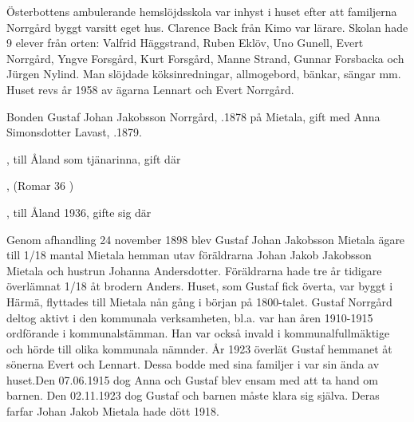 
Österbottens ambulerande hemslöjdsskola var inhyst i huset efter att familjerna Norrgård byggt varsitt eget hus. Clarence Back från Kimo var lärare. Skolan hade 9 elever från orten: Valfrid Häggstrand, Ruben Eklöv, Uno Gunell, Evert Norrgård, Yngve Forsgård, Kurt Forsgård, Manne Strand, Gunnar Forsbacka och Jürgen Nylind. Man slöjdade köksinredningar, allmogebord, bänkar, sängar mm. Huset revs år 1958 av ägarna Lennart och Evert Norrgård.


Bonden Gustaf Johan Jakobsson Norrgård, .1878 på Mietala, gift med Anna Simonsdotter Lavast, .1879.
\begin{jhchildren}
  \item {}, till Åland som tjänarinna, gift där
  \item {}
  \item {}
  \item {}
  \item {}, (Romar 36 )
  \item {}, till Åland 1936, gifte sig där
\end{jhchildren}
Genom afhandling 24 november 1898 blev Gustaf Johan Jakobsson Mietala ägare till 1/18 mantal Mietala hemman utav föräldrarna Johan Jakob Jakobsson Mietala och hustrun Johanna Andersdotter. Föräldrarna hade tre år tidigare överlämnat 1/18 åt brodern Anders.
Huset, som Gustaf fick överta, var byggt i Härmä, flyttades till Mietala nån gång i början på 1800-talet. Gustaf Norrgård deltog aktivt i den kommunala verksamheten, bl.a. var han åren 1910-1915 ordförande i kommunalstämman. Han var också invald i kommunalfullmäktige och hörde till olika kommunala nämnder. År 1923 överlät Gustaf hemmanet åt sönerna Evert och
Lennart. Dessa bodde med sina familjer i var sin ända av huset.Den 07.06.1915 dog Anna och Gustaf blev ensam med att ta hand om barnen. Den 02.11.1923 dog Gustaf och barnen måste klara sig själva. Deras farfar Johan Jakob Mietala hade dött 1918.



